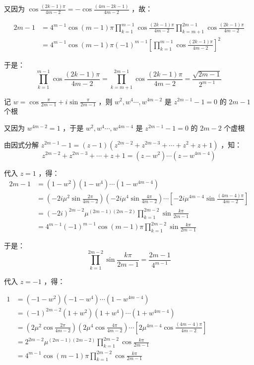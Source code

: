 又因为 $\displaystyle{\cos\frac{(2k-1)\pi}{4m-2}=-\cos\frac{(4m-2k-1)}{4m-2}}$ ，故：

\begin{equation}
\begin{aligned}
2m-1&=4^{m-1}\cos(m-1)\pi\prod_{k=1}^{m-1}\cos{\frac{(2k-1)\pi}{4m-2}}\prod_{k=m+1}^{2m-1}\cos{\frac{(2k-1)\pi}{4m-2}}\\ &=4^{m-1}\cos(m-1)\pi(-1)^{m-1}\left[\prod_{k=1}^{m-1}\cos{\frac{(2k-1)\pi}{4m-2}}\right]^2
\end{aligned}
\end{equation}

于是：\begin{equation}
\prod_{k=1}^{m-1}\cos{\frac{(2k-1)\pi}{4m-2}}=\prod_{k=m+1}^{2m-1}\cos{\frac{(2k-1)\pi}{4m-2}}=\frac{\sqrt{2m-1}}{2^{m-1}}\tag{1}\end{equation}

记 $\displaystyle{w=\cos\frac{\pi}{2m-1}+i\sin\frac{\pi}{2m-1}}$ ，则 $w^2,w^4\cdots,w^{4m-2}$ 是 $z^{2m-1}-1=0$ 的 $2m-1$ 个根

又因为 $w^{4m-2}=1$ ，于是 $w^2,w^4\cdots ,w^{4m-4}$ 是 $z^{2m-1}-1=0$ 的 $2m-2$ 个虚根

由因式分解 $\displaystyle{z^{2m-1}-1=(z-1)(z^{2m-2}+z^{2m-3}+\cdots+z^{2}+z+1)}$ ，知：
$$z^{2m-2}+z^{2m-3}+\cdots+z+1=(z-w^2)\cdots(z-w^{4m-4})$$

代入 $z=1$ ，得：
$$\begin{eqnarray*} 2m-1&=(1-w^2)(1-w^4)\cdots(1-w^{4m-4})\\ &=\left(-2i\mu^2\sin\frac{2\pi}{4m-2}\right)\left(-2i\mu^4\sin\frac{4\pi}{4m-2}\right)\cdots\left[-2i\mu^{4m-4}\sin\frac{(4m-4)\pi}{4m-2}\right]\\ &=(-2i)^{2m-2}\mu^{(2m-1)(2m-2)}\prod_{k=1}^{2m-2}\sin\frac{k\pi}{2m-1}\\ &=4^{m-1}(-1)^{m-1}\cos(m-1)\pi\prod_{k=1}^{2m-2}\sin\frac{k\pi}{2m-1} \end{eqnarray*} $$

于是： 
\begin{equation}
\prod_{k=1}^{2m-2}\sin\frac{k\pi}{2m-1}=\frac{2m-1}{4^{m-1}}\tag{9} 
\end{equation}

代入 $z=-1$ ，得：

$\begin{eqnarray*} 1&=(-1-w^2)(-1-w^4)\cdots(1-w^{4m-4})\\ &=(-1)^{2m-2}(1+w^2)(1+w^4)\cdots(1+w^{4m-4})\\ &=\left(2\mu^2\cos\frac{2\pi}{4m-2}\right)\left(2\mu^4\cos\frac{4\pi}{4m-2}\right)\cdots\left[2\mu^{4m-4}\cos\frac{(4m-4)\pi}{4m-2}\right]\\ &=2^{2m-2}\mu^{(2m-1)(2m-2)}\prod_{k=1}^{2m-2}\cos\frac{k\pi}{2m-1}\\ &=4^{m-1}\cos(m-1)\pi\prod_{k=1}^{2m-2}\cos\frac{k\pi}{2m-1} \end{eqnarray*}$ 

